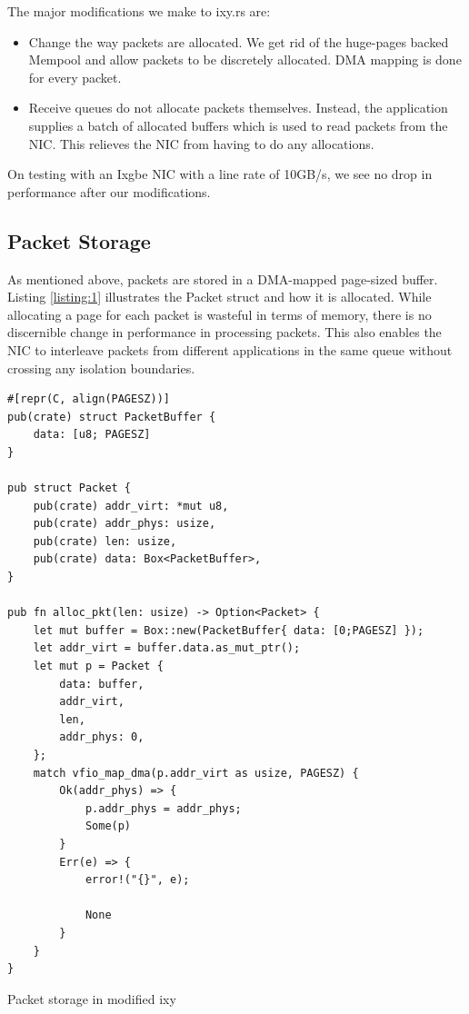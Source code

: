The major modifications we make to ixy.rs are:
\begin{itemize}
    \item{Change the way packets are allocated. We get rid of the huge-pages backed Mempool and allow packets to be discretely allocated. DMA mapping is done for every packet. }
\item{Receive queues do not allocate packets themselves. Instead, the application supplies a batch of allocated buffers which is used to read packets from the NIC. This relieves the NIC from having to do any allocations. }
\end{itemize}

On testing with an Ixgbe NIC with a line rate of 10GB/s, we see no drop in performance after our modifications.

\subsection{Packet Storage}
As mentioned above, packets are stored in a DMA-mapped page-sized buffer. Listing \ref{listing:1} illustrates the Packet struct and how it is allocated. While allocating a page for each packet is wasteful in terms of memory, there is no discernible change in performance in processing packets. This also enables the NIC to interleave packets from different applications in the same queue without crossing any isolation boundaries.

\begin{listing}[!ht]
\begin{verbatim}
#[repr(C, align(PAGESZ))]
pub(crate) struct PacketBuffer {
    data: [u8; PAGESZ]
}

pub struct Packet {
    pub(crate) addr_virt: *mut u8,
    pub(crate) addr_phys: usize,
    pub(crate) len: usize,
    pub(crate) data: Box<PacketBuffer>,
}

pub fn alloc_pkt(len: usize) -> Option<Packet> {
    let mut buffer = Box::new(PacketBuffer{ data: [0;PAGESZ] });
    let addr_virt = buffer.data.as_mut_ptr();
    let mut p = Packet {
        data: buffer,
        addr_virt,
        len,
        addr_phys: 0,
    };
    match vfio_map_dma(p.addr_virt as usize, PAGESZ) {
        Ok(addr_phys) => {
            p.addr_phys = addr_phys;
            Some(p)
        }
        Err(e) => {
            error!("{}", e);

            None
        }
    }
}
\end{verbatim}
\caption{Packet storage in modified ixy}
\label{listing:1}
\end{listing}


